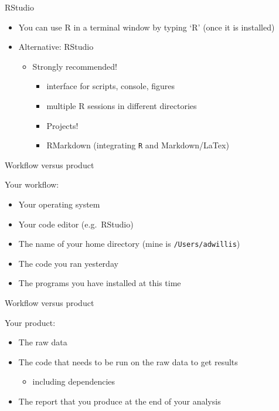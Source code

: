 \documentclass[ignorenonframetext,]{beamer}
\providecommand{\tightlist}{%
  \setlength{\itemsep}{0pt}\setlength{\parskip}{0pt}}
\begin{document}
\begin{frame}[fragile]{RStudio}
\protect\hypertarget{rstudio}{}

\begin{itemize}
\tightlist
\item
  You can use R in a terminal window by typing `R' (once it is
  installed)
\item
  Alternative: RStudio

  \begin{itemize}
  \tightlist
  \item
    Strongly recommended!

    \begin{itemize}
    \tightlist
    \item
      interface for scripts, console, figures
    \item
      multiple R sessions in different directories
    \item
      Projects!
    \item
      RMarkdown (integrating \texttt{R} and Markdown/LaTex)
    \end{itemize}
  \end{itemize}
\end{itemize}

\end{frame}

\begin{frame}[fragile]{Workflow versus product}
\protect\hypertarget{workflow-versus-product}{}

Your workflow:

\begin{itemize}
\tightlist
\item
  Your operating system
\item
  Your code editor (e.g.~RStudio)
\item
  The name of your home directory (mine is \texttt{/Users/adwillis})
\item
  The code you ran yesterday
\item
  The programs you have installed at this time
\end{itemize}

\end{frame}

\begin{frame}{Workflow versus product}
\protect\hypertarget{workflow-versus-product-1}{}

Your product:

\begin{itemize}
\tightlist
\item
  The raw data
\item
  The code that needs to be run on the raw data to get results

  \begin{itemize}
  \tightlist
  \item
    including dependencies
  \end{itemize}
\item
  The report that you produce at the end of your analysis
\end{itemize}

\end{frame}
\end{document}
